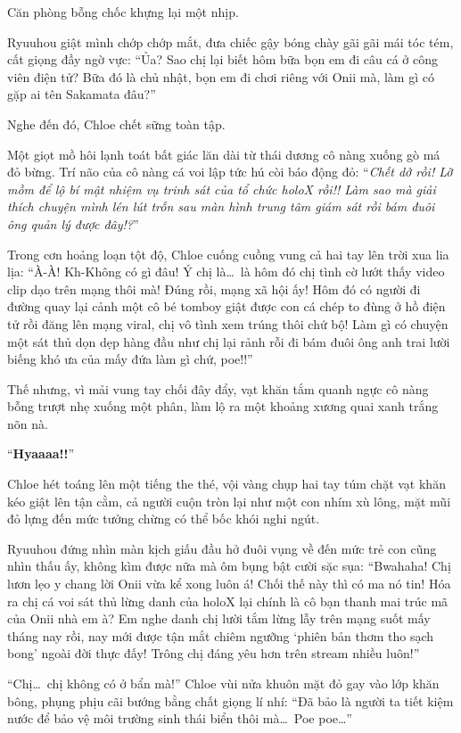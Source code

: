 \documentclass[../main.tex]{subfiles}
\begin{document}
Căn phòng bỗng chốc khựng lại một nhịp.

Ryuuhou giật mình chớp chớp mắt, đưa chiếc gậy bóng chày gãi gãi mái tóc tém, cất giọng đầy ngờ vực: ``Ủa? Sao chị lại biết hôm bữa bọn em đi câu cá ở công viên điện tử? Bữa đó là chủ nhật, bọn em đi chơi riêng với Onii mà, làm gì có gặp ai tên Sakamata đâu?''

Nghe đến đó, Chloe chết sững toàn tập.

Một giọt mồ hôi lạnh toát bất giác lăn dài từ thái dương cô nàng xuống gò má đỏ bừng. Trí não của cô nàng cá voi lập tức hú còi báo động đỏ: ``\textit{Chết dở rồi! Lỡ mồm để lộ bí mật nhiệm vụ trinh sát của tổ chức holoX rồi!! Làm sao mà giải thích chuyện mình lén lút trốn sau màn hình trung tâm giám sát rồi bám đuôi ông quản lý được đây!?}''

Trong cơn hoảng loạn tột độ, Chloe cuống cuồng vung cả hai tay lên trời xua lia lịa: ``À-À! Kh-Không có gì đâu! Ý chị là\dots\ là hôm đó chị tình cờ lướt thấy video clip dạo trên mạng thôi mà! Đúng rồi, mạng xã hội ấy! Hôm đó có người đi đường quay lại cảnh một cô bé tomboy giật được con cá chép to đùng ở hồ điện tử rồi đăng lên mạng viral, chị vô tình xem trúng thôi chứ bộ! Làm gì có chuyện một sát thủ dọn dẹp hàng đầu như chị lại rảnh rỗi đi bám đuôi ông anh trai lười biếng khó ưa của mấy đứa làm gì chứ, poe!!''

Thế nhưng, vì mải vung tay chối đây đẩy, vạt khăn tắm quanh ngực cô nàng bỗng trượt nhẹ xuống một phân, làm lộ ra một khoảng xương quai xanh trắng nõn nà.

``\textbf{Hyaaaa!!}''

Chloe hét toáng lên một tiếng the thé, vội vàng chụp hai tay túm chặt vạt khăn kéo giật lên tận cằm, cả người cuộn tròn lại như một con nhím xù lông, mặt mũi đỏ lựng đến mức tưởng chừng có thể bốc khói nghi ngút.

Ryuuhou đứng nhìn màn kịch giấu đầu hở đuôi vụng về đến mức trẻ con cũng nhìn thấu ấy, không kìm được nữa mà ôm bụng bật cười sặc sụa: ``Bwahaha! Chị lươn lẹo y chang lời Onii vừa kể xong luôn á! Chối thế này thì có ma nó tin! Hóa ra chị cá voi sát thủ lừng danh của holoX lại chính là cô bạn thanh mai trúc mã của Onii nhà em à? Em nghe danh chị lười tắm lừng lẫy trên mạng suốt mấy tháng nay rồi, nay mới được tận mắt chiêm ngưỡng `phiên bản thơm tho sạch bong' ngoài đời thực đấy! Trông chị đáng yêu hơn trên stream nhiều luôn!''

``Chị\dots\ chị không có ở bẩn mà!'' Chloe vùi nửa khuôn mặt đỏ gay vào lớp khăn bông, phụng phịu cãi bướng bằng chất giọng lí nhí: ``Đã bảo là người ta tiết kiệm nước để bảo vệ môi trường sinh thái biển thôi mà\dots\ Poe poe\dots''
\end{document}
